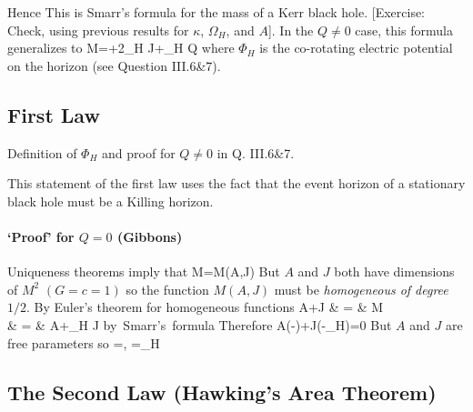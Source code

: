 Hence
This is Smarr's formula for the mass of a Kerr 
black hole. [Exercise:  Check, using previous results for $\kappa$, $\Omega_H$,
and $A$].  In the $Q\neq 0$ case, this formula generalizes to 
\be
M=+2\Omega_H J+\Phi_H Q
\ee
where $\Phi_H$ is the co-rotating electric potential on the horizon (see Question III.6\&7).

\subsection{First Law}  

\begin{list}{)}
{}
\item Definition of $\Phi_H$ and proof for $Q\neq 0$ in Q. III.6\&7.

\item This statement of the first law uses the fact that the event horizon 
of a stationary black hole must be a Killing horizon.
\end{list}

\paragraph{`Proof' for $Q= 0$ (Gibbons)}  Uniqueness theorems imply that
\be
M=M(A,J)
\ee
But $A$ and $J$ both have dimensions of $M^2$ $(G=c=1)$ so the function 
$M(A,J)$ must be \emph{homogeneous of degree $1/2$}.  By Euler's theorem for
homogeneous functions
\bea
A+J & = & \half M \\
 & = & \frac{\kappa}{8\pi}A+\Omega_H J \quad \mbox{by Smarr's formula}
\eea
Therefore 
\be
A\left(-\frac{\kappa}{8\pi}\right)+J\left(-\Omega_H\right)=0
\ee
But $A$ and $J$ are free parameters so 
\be
{}=\frac{\kappa}{8\pi}, \quad {}=\Omega_H
\ee

\subsection{The Second Law (Hawking's Area Theorem)}

